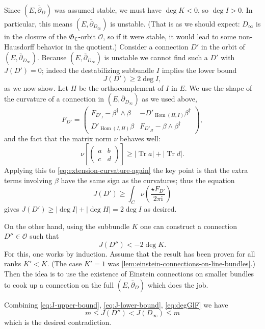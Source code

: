 \documentclass[12pt,letterpaper,reqno]{article}
\numberwithin{equation}{section}
\newcommand{\fG}{{\mathfrak G}}
\newcommand{\cO}{\ensuremath{\mathcal O}}
\newcommand{\C}{\ensuremath{\mathbb C}}
\newcommand{\I}{{\mathrm i}}
\newcommand{\abs}[1]{\lvert#1\rvert}
\DeclareMathOperator{\Tr}{Tr}
\DeclareMathOperator{\Hom}{Hom}
\newcommand{\fixme}[1]{{\color{orange}{[#1]}}}
\begin{document}
\begin{pf}
Since $(E,\bar\partial_D)$ was assumed stable,
we must have $\deg K < 0$, so $\deg I > 0$.
In particular, this means $(E,\bar\partial_{D_\infty})$ 
is unstable. (That is as we should expect: $D_\infty$ is
in the closure of the $\fG_\C$-orbit $\cO$, so if it
were stable, it would lead to some non-Hausdorff behavior
in the quotient.)
Consider a connection $D'$ in the orbit of $(E,\bar\partial_{D_\infty})$.
Because $(E,\bar\partial_{D_\infty})$ is unstable
we cannot find such a $D'$ with $J(D') = 0$; indeed the destabilizing
subbundle $I$ implies the lower bound
\begin{equation} \label{eq:J-lower-bound}
  J(D') \ge 2 \deg I,
\end{equation}
as we now show.
Let $H$ be the orthocomplement of $I$ in $E$.
We use the shape of the
curvature of a connection in $(E,\bar\partial_{D_\infty})$
as we used above,
\begin{equation} \label{eq:extension-curvature-again}
  F_{D'} = \begin{pmatrix} F_{D'_I} - \beta^\dagger \wedge \beta & - D'_{\Hom(H,I)} \beta^\dagger \\ D'_{\Hom(I,H)} \beta & F_{D'_{H}} - \beta \wedge \beta^\dagger \end{pmatrix},
\end{equation}
and the fact that the matrix norm $\nu$ behaves well:
\begin{equation}
  \nu\left[\begin{pmatrix} a & b \\ c & d \end{pmatrix} \right] \ge \abs{\Tr a} + \abs{\Tr d}.
\end{equation}
Applying this to \eqref{eq:extension-curvature-again} the key point
is that the extra terms involving $\beta$ have the same sign
as the curvatures; thus the equation
\begin{equation}
  J(D') \ge \int_C \nu\left(\frac{\star F_{D'}}{2 \pi \I}\right)
\end{equation}
gives $J(D') \ge \abs{\deg I}+\abs{\deg H} = 2 \deg I$
as desired.

On the other hand, using the subbundle $K$ one can construct
a connection $D'' \in \cO$ such that
\begin{equation} \label{eq:J-upper-bound}
  J(D'') < -2 \deg K.
\end{equation}
For this, one works by induction. Assume that the
result has been proven for all ranks $K'<K$.
(The case $K'=1$ was \autoref{lem:einstein-connections-on-line-bundles}.)
Then the idea is to use the existence of Einstein connections on
smaller bundles
to cook up a connection on the full $(E,\bar\partial_D)$
which does the job. \fixme{...}

Combining \eqref{eq:J-upper-bound}, \eqref{eq:J-lower-bound}, \eqref{eq:degGlF}
we have
\begin{equation}
 m \le J(D'') < J(D_\infty) \le m
\end{equation}
which is the desired contradiction.
\end{pf}
\end{document}
